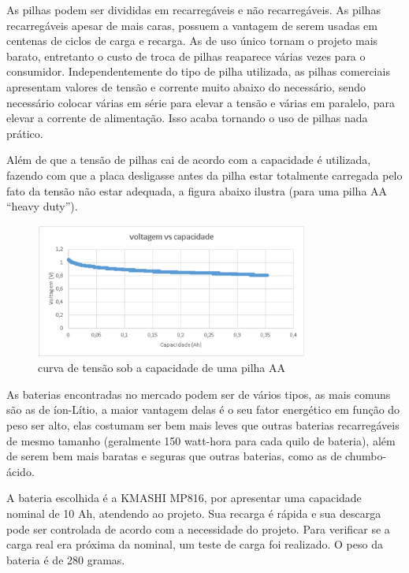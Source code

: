 As pilhas podem ser divididas em recarregáveis e não recarregáveis. As pilhas recarregáveis apesar de mais caras, possuem a vantagem de
serem usadas em centenas de ciclos de carga e recarga. As de uso único tornam o projeto mais barato, entretanto o custo de troca de
pilhas reaparece várias vezes para o consumidor. Independentemente do tipo de pilha utilizada, as pilhas comerciais apresentam valores
de tensão e corrente muito abaixo do necessário, sendo necessário colocar várias em série para elevar a tensão e várias em paralelo,
para elevar a corrente de alimentação. Isso acaba tornando o uso de pilhas nada prático.

Além de que a tensão de pilhas cai de acordo com a capacidade é utilizada, fazendo com que a placa desligasse antes da pilha estar
totalmente carregada pelo fato da tensão não estar adequada, a figura abaixo ilustra (para uma pilha AA “heavy duty”).

\begin{figure}[H]
    \centering
    \includegraphics[width=0.8\textwidth]{figuras/volt_vs_cap.eps}
    \caption{curva de tensão sob a capacidade de uma pilha AA}
    \label{fig:volts}
\end{figure}

As baterias encontradas no mercado podem ser de vários tipos, as mais comuns são as de íon-Lítio, a maior vantagem delas é o seu fator
energético em função do peso ser alto, elas costumam ser bem mais leves que outras baterias recarregáveis de mesmo tamanho (geralmente
150 watt-hora para cada quilo de bateria), além de serem bem mais baratas e seguras que outras baterias, como as de chumbo-ácido.

A bateria escolhida é a KMASHI MP816, por apresentar uma capacidade nominal de 10 Ah, atendendo ao projeto. Sua recarga é rápida e sua 
descarga pode ser controlada de acordo com a necessidade do projeto.  Para verificar se a carga real era próxima da nominal, um teste
de carga foi realizado. O peso da bateria é de 280 gramas.

